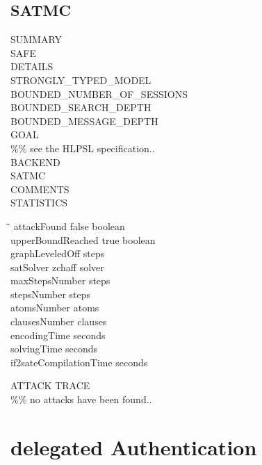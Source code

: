 \subsection{SATMC}
SUMMARY\\
SAFE\\
\linebreak
DETAILS\\
STRONGLY\_TYPED\_MODEL\\
BOUNDED\_NUMBER\_OF\_SESSIONS\\
BOUNDED\_SEARCH\_DEPTH\\
BOUNDED\_MESSAGE\_DEPTH\\
\linebreak
GOAL\\
\%\% see the HLPSL specification..\\
\linebreak
BACKEND\\
SATMC\\
\linebreak
COMMENTS\\
\linebreak
STATISTICS
\begin{nstabbing}
	\hspace{15em}\=\hspace{10em}\=\kill
	attackFound \> false \> boolean\\ 
	upperBoundReached \> true \> boolean \\ 
	graphLeveledOff  \> steps \\ 
	satSolver \> zchaff \> solver \\ 
	maxStepsNumber  \> steps\\ 
	stepsNumber  \> steps \\ 
	atomsNumber  \> atoms \\ 
	clausesNumber  \> clauses\\ 
	encodingTime  \> seconds \\ 
	solvingTime  \> seconds\\ 
	if2sateCompilationTime  \> seconds\\
\end{nstabbing} 

ATTACK TRACE\\
\%\% no attacks have been found..

\section{delegated Authentication}

